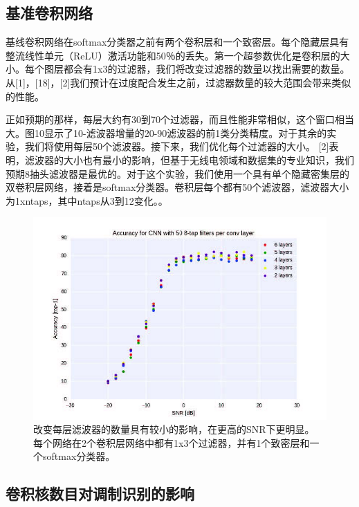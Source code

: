 \subsection{基准卷积网络}

基线卷积网络在softmax分类器之前有两个卷积层和一个致密层。每个隐藏层具有整流线性单元（ReLU）激活功能和50％的丢失。第一个超参数优化是卷积层的大小。每个图层都会有1x3的过滤器，我们将改变过滤器的数量以找出需要的数量。从[1]，[18]，[2]我们预计在过度配合发生之前，过滤器数量的较大范围会带来类似的性能。\par

正如预期的那样，每层大约有30到70个过滤器，而且性能非常相似，这个窗口相当大。图10显示了10-滤波器增量的20-90滤波器的前1类分类精度。对于其余的实验，我们将使用每层50个滤波器。接下来，我们优化每个过滤器的大小。 [2]表明，滤波器的大小也有最小的影响，但基于无线电领域和数据集的专业知识，我们预期8抽头滤波器是最优的。对于这个实验，我们使用一个具有单个隐藏密集层的双卷积层网络，接着是softmax分类器。卷积层每个都有50个滤波器，滤波器大小为1xntaps，其中ntaps从3到12变化。。\par

\begin{figure}[!h]
	\centering
	\includegraphics[scale=1]{figures/chapter_5/fig3}
	\caption{改变每层滤波器的数量具有较小的影响，在更高的SNR下更明显。
		每个网络在2个卷积层网络中都有1x3个过滤器，并有1个致密层和一个softmax分类器。}
\end{figure}


\subsection{卷积核数目对调制识别的影响}

